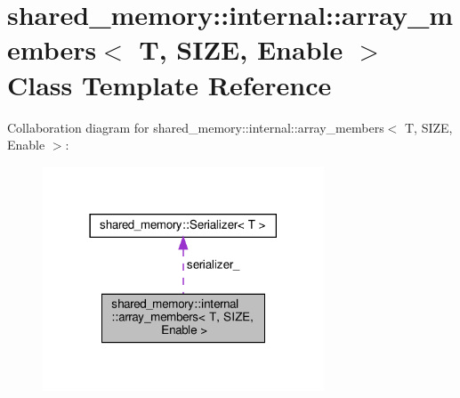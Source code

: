 \hypertarget{classshared__memory_1_1internal_1_1array__members}{}\section{shared\+\_\+memory\+:\+:internal\+:\+:array\+\_\+members$<$ T, S\+I\+ZE, Enable $>$ Class Template Reference}
\label{classshared__memory_1_1internal_1_1array__members}


Collaboration diagram for shared\+\_\+memory\+:\+:internal\+:\+:array\+\_\+members$<$ T, S\+I\+ZE, Enable $>$\+:
\nopagebreak
\begin{figure}[H]
\begin{center}
\leavevmode
\includegraphics[width=237pt]{classshared__memory_1_1internal_1_1array__members__coll__graph}
\end{center}
\end{figure}
